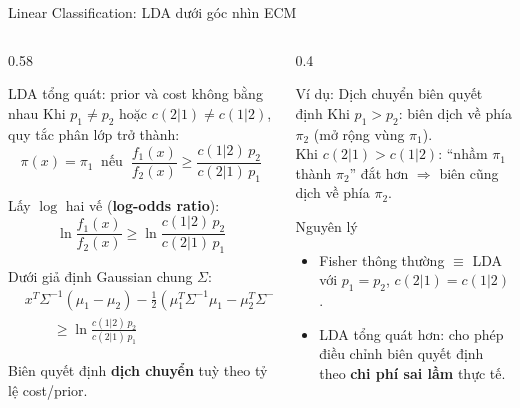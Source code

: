 
\begin{frame}[shrink=40]{Linear Classification: LDA dưới góc nhìn ECM}
    \begin{columns}[T]
        \begin{column}{0.58\textwidth}
            \begin{block}{LDA tổng quát: prior và cost không bằng nhau}
                Khi $p_1 \neq p_2$ hoặc $c(2|1) \neq c(1|2)$, quy tắc phân lớp trở thành:
                $$ \pi(x) = \pi_1 \;\; \text{nếu} \;\; \frac{f_1(x)}{f_2(x)} \geq \frac{c(1|2)\,p_2}{c(2|1)\,p_1} $$

                \vspace{0.3cm}
                Lấy $\log$ hai vế (\textbf{log-odds ratio}):
                $$ \ln\frac{f_1(x)}{f_2(x)} \geq \ln\frac{c(1|2)\,p_2}{c(2|1)\,p_1} $$

                \vspace{0.3cm}
                Dưới giả định Gaussian chung $\Sigma$:
                \begin{align*}
                    &x^T\Sigma^{-1}(\mu_1 - \mu_2) - \frac{1}{2}(\mu_1^T\Sigma^{-1}\mu_1 - \mu_2^T\Sigma^{-1}\mu_2) \\
                    &\qquad \geq \ln\frac{c(1|2)\,p_2}{c(2|1)\,p_1}
                \end{align*}

                \vspace{0.2cm}
                Biên quyết định \textbf{dịch chuyển} tuỳ theo tỷ lệ cost/prior.
            \end{block}
        \end{column}

        \begin{column}{0.4\textwidth}
            \begin{exampleblock}{Ví dụ: Dịch chuyển biên quyết định}
                Khi $p_1 > p_2$: biên dịch về phía $\pi_2$ (mở rộng vùng $\pi_1$).\\[0.3cm]
                Khi $c(2|1) > c(1|2)$: ``nhầm $\pi_1$ thành $\pi_2$'' đắt hơn $\Rightarrow$ biên cũng dịch về phía $\pi_2$.
            \end{exampleblock}

            \begin{alertblock}{Nguyên lý}
                \begin{itemize}
                    \item Fisher thông thường $\equiv$ LDA với $p_1 = p_2$, $c(2|1) = c(1|2)$.
                    \item LDA tổng quát hơn: cho phép điều chỉnh biên quyết định theo \textbf{chi phí sai lầm} thực tế.
                \end{itemize}
            \end{alertblock}
        \end{column}
    \end{columns}
\end{frame}

